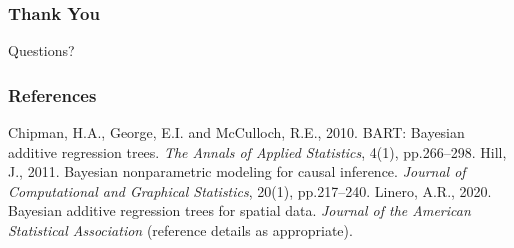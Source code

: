 \documentclass{beamer}
\begin{document}
\begin{frame}
\frametitle{Thank You}
\begin{center}
Questions?
\end{center}
\end{frame}

\begin{frame}[allowframebreaks]
\frametitle{References}
\normalsize
\begin{thebibliography}{99}
 Chipman, H.A., George, E.I. and McCulloch, R.E., 2010. BART: Bayesian additive regression trees. \emph{The Annals of Applied Statistics}, 4(1), pp.266--298.
 Hill, J., 2011. Bayesian nonparametric modeling for causal inference. \emph{Journal of Computational and Graphical Statistics}, 20(1), pp.217--240.
 Linero, A.R., 2020. Bayesian additive regression trees for spatial data. \emph{Journal of the American Statistical Association} (reference details as appropriate).
\end{thebibliography}
\end{frame}
\end{document}
